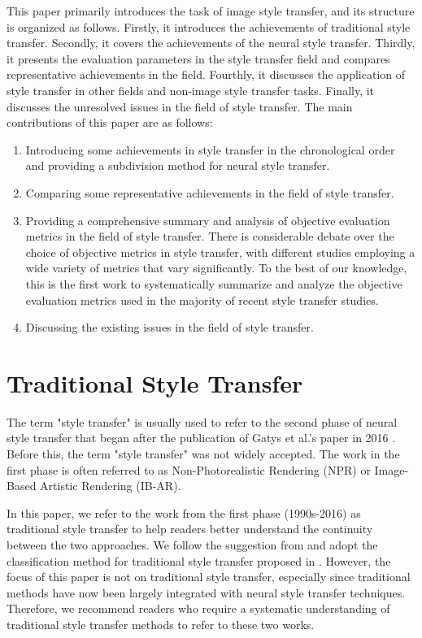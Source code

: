 \documentclass[preprint,12pt]{elsarticle}
\begin{document}
This paper primarily introduces the task of image style transfer, and its structure is organized as follows. Firstly, it introduces the achievements of traditional style transfer. Secondly, it covers the achievements of the neural style transfer. Thirdly, it presents the evaluation parameters in the style transfer field and compares representative achievements in the field. Fourthly, it discusses the application of style transfer in other fields and non-image style transfer tasks. Finally, it discusses the unresolved issues in the field of style transfer. The main contributions of this paper are as follows:
\begin{enumerate}
    \item Introducing some achievements in style transfer in the chronological order and providing a subdivision method for neural style transfer.
    \item Comparing some representative achievements in the field of style transfer.
    \item Providing a comprehensive summary and analysis of objective evaluation metrics in the field of style transfer. There is considerable debate over the choice of objective metrics in style transfer, with different studies employing a wide variety of metrics that vary significantly. To the best of our knowledge, this is the first work to systematically summarize and analyze the objective evaluation metrics used in the majority of recent style transfer studies.
    \item Discussing the existing issues in the field of style transfer.
\end{enumerate}

% 
\section{Traditional Style Transfer}

The term "style transfer" is usually used to refer to the second phase of neural style transfer that began after the publication of Gatys et al.'s paper in 2016 \citep{02gatys2016image}. Before this, the term "style transfer" was not widely accepted. The work in the first phase is often referred to as Non-Photorealistic Rendering (NPR) or Image-Based Artistic Rendering (IB-AR).

In this paper, we refer to the work from the first phase (1990s-2016) as traditional style transfer to help readers better understand the continuity between the two approaches. We follow the suggestion from \citep{01jing2019neural} and adopt the classification method for traditional style transfer proposed in \citep{21kyprianidis2012state}. However, the focus of this paper is not on traditional style transfer, especially since traditional methods have now been largely integrated with neural style transfer techniques. Therefore, we recommend readers who require a systematic understanding of traditional style transfer methods to refer to these two works\citep{01jing2019neural,21kyprianidis2012state}.
\end{document}
